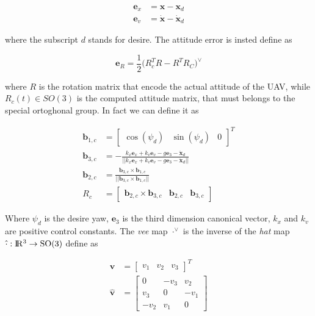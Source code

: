 \begin{align}
	\mathbf{e}_x &= \mathbf{x} - \mathbf{x}_d \\ 
	\mathbf{e}_v &= \dot{\mathbf{x}} - \dot{\mathbf{x}}_d
\end{align}

\noindent where the subscript $d$ stands for desire. The attitude error is insted define as

\begin{equation}
	\mathbf{e}_R = \frac{1}{2}\bigl(R_c^TR-R^TR_C \bigl)^{\vee}
\end{equation}

\noindent where $R$ is the rotation matrix that encode the actual attitude of the UAV, while $R_c(t) \in SO(3)$ is the computed attitude matrix, that must belongs to the special ortoghonal group. In fact we can define it as

\begin{align}
	\mathbf{b}_{1,c} &= \begin{bmatrix} \cos(\psi_d) & \sin(\psi_d) & 0 \end{bmatrix}^T \\
	\mathbf{b}_{3,c} &= -\frac{k_x\mathbf{e}_x+k_v\mathbf{e}_v-g\mathbf{e}_3-\ddot{\mathbf{x}}_d}{||k_x\mathbf{e}_x+k_v\mathbf{e}_v-g\mathbf{e}_3-\ddot{\mathbf{x}}_d||} \\
	\mathbf{b}_{2,c} &= \frac{\mathbf{b}_{3,c}\times\mathbf{b}_{1,c}}{||\mathbf{b}_{3,c}\times\mathbf{b}_{1,c}||} \\
	R_c &= \left[\begin{array}{c|c|c}\mathbf{b}_{2,c}\times\mathbf{b}_{3,c} & \mathbf{b}_{2,c} & \mathbf{b}_{3,c} \end{array}\right]
\end{align}

\noindent Where $\psi_d$ is the desire yaw, $\mathbf{e}_3$ is the third dimension canonical vector, $k_x$ and $k_v$ are positive control constants. The \textit{vee} map $\cdot^{\vee}$ is the inverse of the \textit{hat} map $\hat{\cdot}: \rm I\!R^3 \rightarrow SO(3)$ define as

\begin{align}
	\mathbf{v} &= \begin{bmatrix} v_1 & v_2 & v_3 \end{bmatrix}^T \nonumber \\ 
	\hat{\mathbf{v}} &= 
	\begin{bmatrix}
		0    & -v_3 & v_2 \\
		v_3  & 0    & -v_1 \\
		-v_2 & v_1  & 0
	\end{bmatrix}
\end{align}

